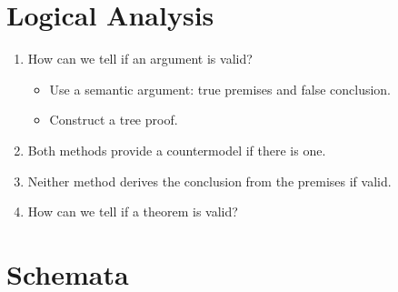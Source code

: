 \documentclass[a4paper, 11pt]{article} %
\begin{document}
\begin{multicols}{2}
\section*{Logical Analysis}

\begin{enumerate}
  \item[\bf Task 2:] How can we tell if an argument is valid? 
    \begin{itemize}
      \item Use a semantic argument: true premises and false conclusion. 
      \item Construct a tree proof.
    \end{itemize}
      \item[\it Pro:] Both methods provide a countermodel if there is one.
      \item[\it Con:] Neither method derives the conclusion from the premises if valid.
    \item[\bf Task 3:] How can we tell if a theorem is valid?
\end{enumerate}



\section*{Schemata}


\end{multicols}
\end{document}
